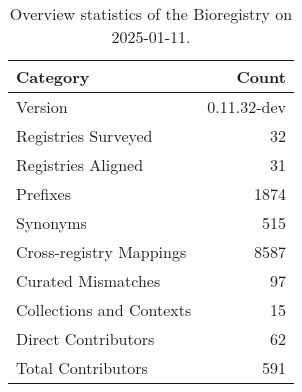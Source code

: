 \begin{table}
\caption{Overview statistics of the Bioregistry on 2025-01-11.}
\label{tab:bioregistry-summary}
\begin{tabular}{lr}
\toprule
Category & Count \\
\midrule
Version & 0.11.32-dev \\
Registries Surveyed & 32 \\
Registries Aligned & 31 \\
Prefixes & 1874 \\
Synonyms & 515 \\
Cross-registry Mappings & 8587 \\
Curated Mismatches & 97 \\
Collections and Contexts & 15 \\
Direct Contributors & 62 \\
Total Contributors & 591 \\
\bottomrule
\end{tabular}
\end{table}
